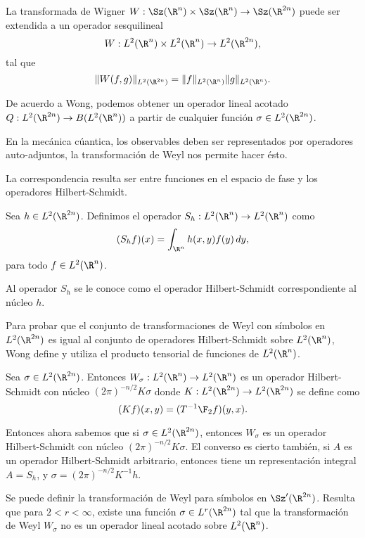   La transformada de Wigner $W : \Sz(\R^{n}) \times
  \Sz(\R^{n}) \to \Sz(\R^{2n})$ puede ser extendida a un
  operador sesquilineal
  \[
    W : L^2(\R^{n}) \times L^2(\R^{n}) \to L^2(\R^{2n}),
  \] 
  tal que
  \[
    \|W(f,g)\|_{L^2(\R^{2n})}
    = \|f\|_{L^2(\R^{n})} \|g\|_{L^2(\R^{n})}.
  \] 

  De acuerdo a Wong, podemos obtener un operador lineal
  acotado $Q : L^2(\R^{2n}) \to B(L^2(\R^{n}))$ a partir de
  cualquier función $\sigma \in L^2(\R^{2n})$.

  En la mecánica cúantica, los observables deben ser
  representados por operadores auto-adjuntos, la
  transformación de Weyl nos permite hacer ésto.

  La correspondencia resulta ser entre funciones en el
  espacio de fase y los operadores Hilbert-Schmidt.

  \begin{definition}
    Sea $h \in L^2(\R^{2n})$. Definimos el operador $S_h :
    L^2(\R^{n}) \to L^2(\R^{n})$ como
    \begin{equation}
      (S_hf)(x)
      = \int_{\R^{n}} h(x,y) f(y) \, dy,
    \end{equation}
    para todo $f \in L^2(\R^{n})$.
  \end{definition}
  Al operador $S_h$ se le conoce como el operador
  Hilbert-Schmidt correspondiente al núcleo $h$.

  Para probar que el conjunto de transformaciones de Weyl
  con símbolos en $L^2(\R^{2n})$ es igual al conjunto de
  operadores Hilbert-Schmidt sobre $L^2(\R^{n})$, Wong
  define y utiliza el producto tensorial de funciones de
  $L^2(\R^{n})$.

  \begin{theorem}
    Sea $\sigma \in L^2(\R^{2n})$. Entonces $W_\sigma :
    L^2(\R^{n}) \to L^2(\R^{n})$ es un operador
    Hilbert-Schmidt con núcleo $(2\pi)^{-n / 2}K \sigma$
    donde $K : L^2(\R^{2n}) \to L^2(\R^{2n})$ se define como
    \[
      (Kf)(x,y)
      = (T^{-1}\F_2 f)(y,x).
    \] 
  \end{theorem}

  Entonces ahora sabemos que si $\sigma \in L^2(\R^{2n})$,
  entonces $W_\sigma$ es un operador Hilbert-Schmidt con
  núcleo $(2\pi)^{-n / 2} K \sigma$. El converso es cierto
  también, si $A$ es un operador Hilbert-Schmidt arbitrario,
  entonces tiene un representación integral $A = S_h$, y
  $\sigma = (2\pi)^{-n / 2} K^{-1}h$.

  Se puede definir la transformación de Weyl para símbolos
  en $\Sz'(\R^{2n})$. Resulta que para $2 < r < \infty$,
  existe una función $\sigma \in L^{r}(\R^{2n})$ tal que la
  transformación de Weyl $W_\sigma$ no es un operador lineal
  acotado sobre $L^2(\R^{n})$.


